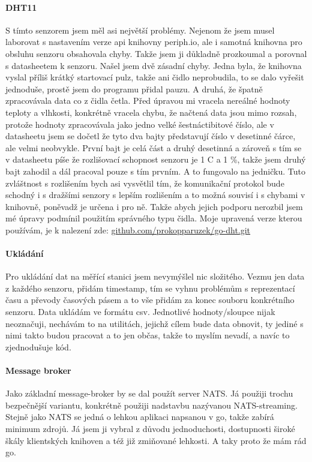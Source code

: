 \paragraph*{DHT11}
S tímto senzorem jsem měl asi největší problémy. Nejenom že jsem musel laborovat s nastavením verze api knihovny 
periph.io, ale i samotná knihovna pro obsluhu senzoru obsahovala chyby. Takže jsem ji důkladně prozkoumal a porovnal 
s datasheetem k senzoru. Našel jsem dvě zásadní chyby. Jedna byla, že knihovna vyslal příliš krátký startovací pulz, 
takže ani čidlo neprobudila, to se dalo vyřešit jednoduše, prostě jsem do programu přidal pauzu. A druhá, že špatně 
zpracovávala data co z čidla četla. Před úpravou mi vracela nereálné hodnoty teploty a vlhkosti, konkrétně vracela 
chybu, že načtená data jsou mimo rozsah, protože hodnoty zpracovávala jako jedno velké šestnáctibitové číslo, ale 
v datasheetu jsem se dočetl že tyto dva bajty představují číslo v desetinné čárce, ale velmi neobvykle. První bajt je 
celá část a druhý desetinná a zároveň s tím se v datasheetu píše že rozlišovací schopnost senzoru je 
1 \textdegree C a 1 \%, takže jsem druhý bajt zahodil a dál pracoval pouze s tím prvním. A to fungovalo na jedničku. 
Tuto zvláštnost s rozlišením bych asi vysvětlil tím, že komunikační protokol bude schodný i s dražšími senzory s lepším 
rozlišením a to možná souvisí i s chybami v knihovně, poněvadž je určena i pro ně. Takže abych jejich podporu nerozbil 
jsem mé úpravy podmínil použitím správného typu čidla. Moje upravená verze kterou používám, je k nalezení zde: 
\href{https://github.com/prokopparuzek/go-dht.git}{github.com/prokopparuzek/go-dht.git}

\paragraph*{Ukládání}
Pro ukládání dat na měřící stanici jsem nevymýšlel nic složitého. Vezmu jen data z každého senzoru, přidám 
\gls{timestamp}, tím se vyhnu problémům s reprezentací času a převody časových pásem a to vše přidám za konec souboru 
konkrétního senzoru. Data ukládám ve formátu \acrshort{csv}. Jednotlivé hodnoty/sloupce nijak neoznačuji, nechávám to na 
utilitách, jejichž cílem bude data obnovit, ty jediné s nimi takto budou pracovat a to jen občas, takže to myslím 
nevadí, a navíc to zjednodušuje kód.

\paragraph*{Message broker}
Jako základní \gls{message-broker} by se dal použít server NATS. Já použiji trochu bezpečnější variantu, konkrétně 
použiji nadstavbu nazývanou NATS-streaming. Stejně jako NATS se jedná o lehkou aplikaci napsanou v go, takže zabírá 
minimum zdrojů. Já jsem ji vybral z důvodu jednoduchosti, dostupnosti široké škály klientských knihoven a též již 
zmiňované lehkosti. A taky proto že mám rád go.


